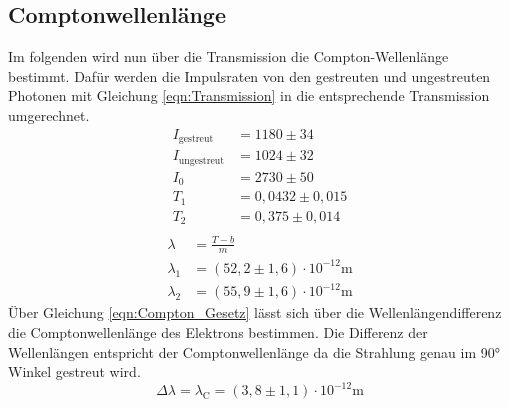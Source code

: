 \subsection{Comptonwellenlänge}
Im folgenden wird nun über die Transmission die Compton-Wellenlänge bestimmt.
Dafür werden die Impulsraten von den gestreuten und ungestreuten Photonen mit Gleichung \ref{eqn:Transmission} in die entsprechende Transmission umgerechnet.
\begin{align*}
    I_{\text{gestreut}} &= 1180 \pm 34  \\ 
    I_{\text{ungestreut}} &= 1024 \pm 32  \\
    I_0 &= 2730 \pm 50 \\
    T_1 &= 0,0432 \pm 0,015 \\
    T_2 &= 0,375 \pm 0,014 \\ 
\end{align*}
\begin{align*}
    \lambda &= \frac{T-b}{m} \\
    \lambda_{1} &=  (52,2 \pm 1,6) \cdot 10^{-12} \text{m}\\
    \lambda_{2} &=  (55,9 \pm 1,6) \cdot 10^{-12} \text{m}
\end{align*}
Über Gleichung \ref{eqn:Compton_Gesetz} lässt sich über die Wellenlängendifferenz die Comptonwellenlänge des Elektrons bestimmen.
Die Differenz der Wellenlängen entspricht der Comptonwellenlänge da die Strahlung genau im 90° Winkel gestreut wird.
\begin{equation*}
    \Delta\lambda = \lambda_{\text{C}} = (3,8\pm 1,1)\cdot 10^{-12} \text{m}
\end{equation*}

